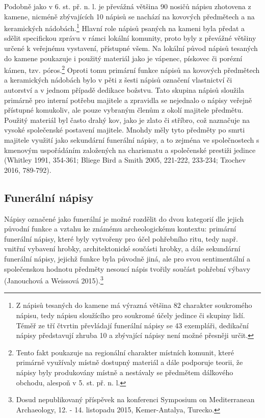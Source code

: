 Podobně jako v 6. st. př. n. l. je převážná většina 90  nosičů nápisu zhotovena z kamene, nicméně zbývajících 10  nápisů se nachází na kovových předmětech a na keramických nádobách.\footnote{Z nápisů tesaných do kamene má výrazná většina 82  charakter soukromého nápisu, tedy nápisu sloužícího pro soukromé účely jedince či skupiny lidí. Téměř ze tří čtvrtin převládají funerální nápisy se 43 exempláři, dedikační nápisy představují zhruba 10  a zbývající nápisy není možné přesněji určit.} Hlavní role nápisů psaných na kameni byla předat a sdělit specifickou zprávu v rámci lokální komunity, proto byly z převážné většiny určené k veřejnému vystavení, přístupné všem. Na lokální původ nápisů tesaných do kamene poukazuje i použitý materiál jako je vápenec, pískovec či porézní kámen, tzv. póros.\footnote{Tento fakt poukazuje na regionální charakter místních komunit, které primárně využívaly místně dostupný materiál a dále podporuje teorii, že nápisy byly produkovány místně a nestávaly se předmětem dálkového obchodu, alespoň v 5. st. př. n. l.} Oproti tomu primární funkce nápisů na kovových předmětech a keramických nádobách bylo v pěti z šesti nápisů označení vlastnictví či autorství a v jednom případě dedikace božstvu. Tato skupina nápisů sloužila primárně pro interní potřebu majitele a zpravidla se nejednalo o nápisy veřejně přístupné komukoliv, ale pouze vybraným členům z okolí majitele předmětu. Použitý materiál byl často drahý kov, jako je zlato či stříbro, což naznačuje na vysoké společenské postavení majitele. Mnohdy měly tyto předměty po smrti majitele využití jako sekundární funerální nápisy, a to zejména ve společnostech s kmenovým uspořádáním založených na charismatu a společenské prestiži jedince (Whitley 1991, 354-361; Bliege Bird a Smith 2005, 221-222, 233-234; Tzochev 2016, 789-792).

\subsection[funerální-nápisy-1]{Funerální nápisy}

Nápisy označené jako funerální je možné rozdělit do dvou kategorií dle jejich původní funkce a vztahu ke známému archeologickému kontextu: primární funerální nápisy, které byly vytvořeny pro účel pohřebního ritu, tedy např. vnitřní vybavení hrobky, architektonické součásti hrobky, a dále sekundární funerální nápisy, jejichž funkce byla původně jiná, ale pro svou sentimentální a společenskou hodnotu předměty nesoucí nápis tvořily součást pohřební výbavy (Janouchová a Weissová 2015).\footnote{Dosud nepublikovaný příspěvek na konferenci Symposium on Mediterranean Archaeology, 12. - 14. listopadu 2015, Kemer-Antalya, Turecko.}

